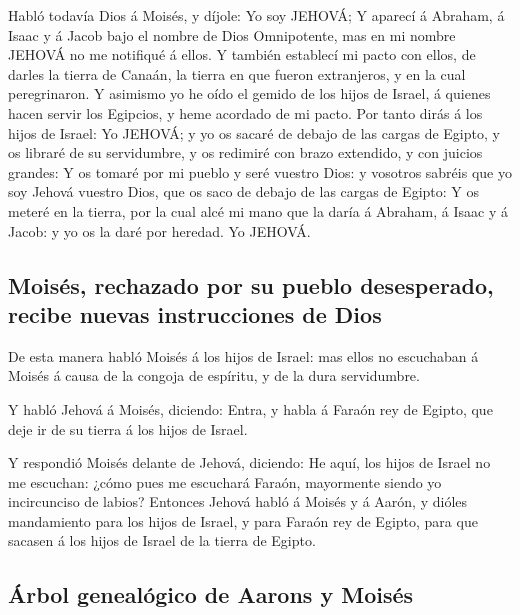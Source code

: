  Habló todavía Dios á Moisés, y díjole: Yo soy JEHOVÁ;
 Y aparecí á Abraham, á Isaac y á Jacob bajo el nombre de
Dios Omnipotente, mas en mi nombre JEHOVÁ no me notifiqué á ellos.
 Y también establecí mi pacto con ellos, de darles la tierra
de Canaán, la tierra en que fueron extranjeros, y en la cual
peregrinaron.  Y asimismo yo he oído el gemido de los hijos
de Israel, á quienes hacen servir los Egipcios, y heme acordado de mi
pacto.  Por tanto dirás á los hijos de Israel: Yo JEHOVÁ; y
yo os sacaré de debajo de las cargas de Egipto, y os libraré de su
servidumbre, y os redimiré con brazo extendido, y con juicios grandes:
 Y os tomaré por mi pueblo y seré vuestro Dios: y vosotros
sabréis que yo soy Jehová vuestro Dios, que os saco de debajo de las
cargas de Egipto:  Y os meteré en la tierra, por la cual
alcé mi mano que la daría á Abraham, á Isaac y á Jacob: y yo os la daré
por heredad. Yo JEHOVÁ.

\hypertarget{moisuxe9s-rechazado-por-su-pueblo-desesperado-recibe-nuevas-instrucciones-de-dios}{%
\subsection{Moisés, rechazado por su pueblo desesperado, recibe nuevas
instrucciones de
Dios}\label{moisuxe9s-rechazado-por-su-pueblo-desesperado-recibe-nuevas-instrucciones-de-dios}}

 De esta manera habló Moisés á los hijos de Israel: mas
ellos no escuchaban á Moisés á causa de la congoja de espíritu, y de la
dura servidumbre.

 Y habló Jehová á Moisés, diciendo:  Entra, y
habla á Faraón rey de Egipto, que deje ir de su tierra á los hijos de
Israel.

 Y respondió Moisés delante de Jehová, diciendo: He aquí,
los hijos de Israel no me escuchan: ¿cómo pues me escuchará Faraón,
mayormente siendo yo incircunciso de labios?  Entonces
Jehová habló á Moisés y á Aarón, y dióles mandamiento para los hijos de
Israel, y para Faraón rey de Egipto, para que sacasen á los hijos de
Israel de la tierra de Egipto.

\hypertarget{uxe1rbol-genealuxf3gico-de-aarons-y-moisuxe9s}{%
\subsection{Árbol genealógico de Aarons y
Moisés}\label{uxe1rbol-genealuxf3gico-de-aarons-y-moisuxe9s}}

